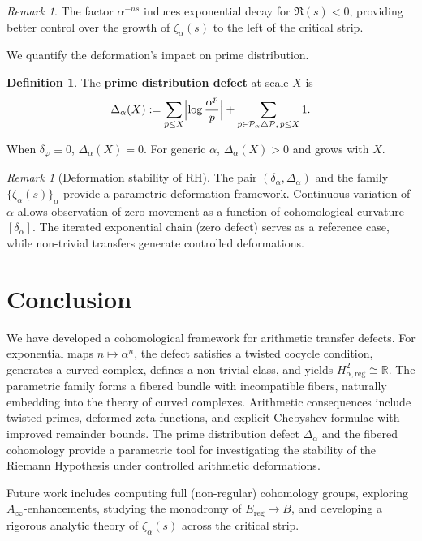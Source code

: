 \documentclass[11pt,a4paper]{article}
\theoremstyle{plain}
\theoremstyle{definition}
\newtheorem{definition}[theorem]{Definition}
\theoremstyle{remark}
\newtheorem{remark}[theorem]{Remark}
\newcommand{\RR}{\mathbb{R}}
\begin{document}
	\begin{remark}
		The factor $\alpha^{-ns}$ induces exponential decay for $\Re(s)<0$, providing better control over the growth of $\zeta_\alpha(s)$ to the left of the critical strip.
	\end{remark}
	
	We quantify the deformation's impact on prime distribution.
	
	\begin{definition}
		The \textbf{prime distribution defect} at scale $X$ is
		\[
		\Delta_\alpha(X):=\sum_{p\leq X}\Bigl|\log\frac{\alpha^p}{p}\Bigr|+\sum_{p\in\mathcal{P}_\alpha\triangle\mathcal{P},\,p\leq X}1.
		\]
	\end{definition}
	
	When $\delta_\varphi\equiv 0$, $\Delta_\alpha(X)=0$. For generic $\alpha$, $\Delta_\alpha(X)>0$ and grows with $X$.
	
	\begin{remark}[Deformation stability of RH]
		The pair $(\delta_\alpha,\Delta_\alpha)$ and the family $\{\zeta_\alpha(s)\}_\alpha$ provide a parametric deformation framework. Continuous variation of $\alpha$ allows observation of zero movement as a function of cohomological curvature $[\delta_\alpha]$. The iterated exponential chain (zero defect) serves as a reference case, while non-trivial transfers generate controlled deformations.
	\end{remark}
	
	\section{Conclusion}
	\label{sec:conclusion}
	We have developed a cohomological framework for arithmetic transfer defects. For exponential maps $n\mapsto\alpha^n$, the defect satisfies a twisted cocycle condition, generates a curved complex, defines a non-trivial class, and yields $H^2_{\alpha,\mathrm{reg}}\cong\RR$. The parametric family forms a fibered bundle with incompatible fibers, naturally embedding into the theory of curved complexes. Arithmetic consequences include twisted primes, deformed zeta functions, and explicit Chebyshev formulae with improved remainder bounds. The prime distribution defect $\Delta_\alpha$ and the fibered cohomology provide a parametric tool for investigating the stability of the Riemann Hypothesis under controlled arithmetic deformations.
	
	Future work includes computing full (non-regular) cohomology groups, exploring $A_\infty$-enhancements, studying the monodromy of $E_{\mathrm{reg}}\to B$, and developing a rigorous analytic theory of $\zeta_\alpha(s)$ across the critical strip.
	
\end{document}
